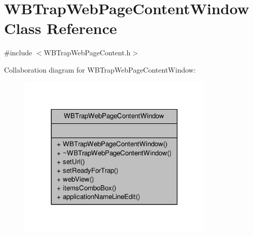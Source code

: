 \hypertarget{class_w_b_trap_web_page_content_window}{\section{W\-B\-Trap\-Web\-Page\-Content\-Window Class Reference}
\label{d8/dc6/class_w_b_trap_web_page_content_window}
}


{\ttfamily \#include $<$W\-B\-Trap\-Web\-Page\-Content.\-h$>$}



Collaboration diagram for W\-B\-Trap\-Web\-Page\-Content\-Window\-:
\nopagebreak
\begin{figure}[H]
\begin{center}
\leavevmode
\includegraphics[width=266pt]{de/d5f/class_w_b_trap_web_page_content_window__coll__graph}
\end{center}
\end{figure}
